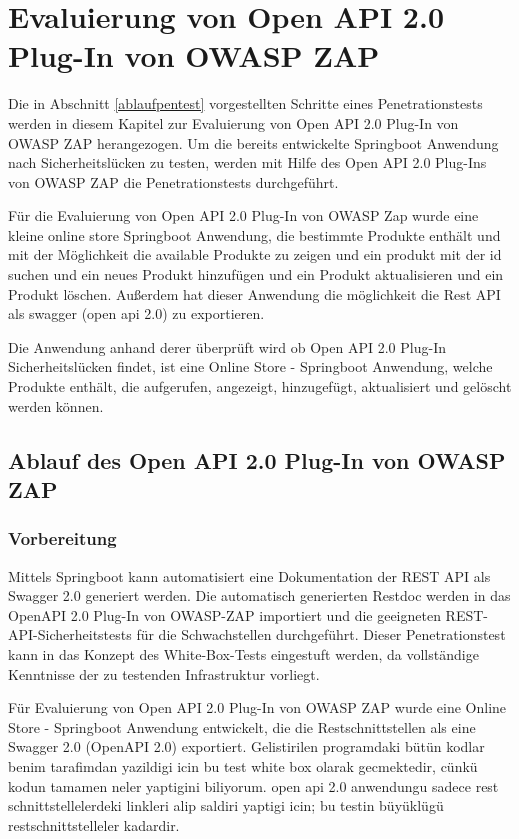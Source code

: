\chapter{Evaluierung von Open API 2.0 Plug-In von OWASP ZAP}
\label{cha:k5}

Die in Abschnitt \ref{ablaufpentest} vorgestellten Schritte eines Penetrationstests werden in diesem Kapitel zur Evaluierung von Open API 2.0 Plug-In von OWASP ZAP herangezogen. Um die bereits entwickelte Springboot Anwendung nach Sicherheitslücken zu testen, werden mit Hilfe des Open API 2.0 Plug-Ins von OWASP ZAP die Penetrationstests durchgeführt.



Für die Evaluierung von Open API 2.0 Plug-In von OWASP Zap wurde eine kleine online store Springboot Anwendung, die bestimmte Produkte enthält und mit der Möglichkeit die available Produkte zu zeigen und ein produkt mit der id suchen und ein neues Produkt hinzufügen und ein Produkt aktualisieren und ein Produkt löschen. Außerdem hat dieser Anwendung die möglichkeit die Rest API als swagger (open api 2.0)   zu exportieren.

Die Anwendung anhand derer überprüft wird ob Open API 2.0 Plug-In Sicherheitslücken findet, ist eine Online Store - Springboot Anwendung, welche Produkte enthält, die aufgerufen, angezeigt, hinzugefügt, aktualisiert und gelöscht werden können.

\section{Ablauf des Open API 2.0 Plug-In von OWASP ZAP}

\subsection{Vorbereitung}

Mittels Springboot kann automatisiert eine Dokumentation der REST API als Swagger 2.0 generiert werden. Die automatisch generierten Restdoc werden in das OpenAPI 2.0 Plug-In von OWASP-ZAP importiert und die geeigneten REST-API-Sicherheitstests für die Schwachstellen durchgeführt. Dieser Penetrationstest kann in das Konzept des White-Box-Tests eingestuft werden, da vollständige Kenntnisse der zu testenden Infrastruktur vorliegt.

Für Evaluierung von Open API 2.0 Plug-In von OWASP ZAP wurde eine Online Store - Springboot Anwendung entwickelt, die die Restschnittstellen als eine Swagger 2.0 (OpenAPI 2.0) exportiert. Gelistirilen programdaki bütün kodlar benim tarafimdan yazildigi icin bu test white box olarak gecmektedir, cünkü kodun tamamen neler yaptigini biliyorum. open api 2.0 anwendungu sadece rest schnittstellelerdeki linkleri alip saldiri yaptigi icin; bu testin büyüklügü restschnittstelleler kadardir.

